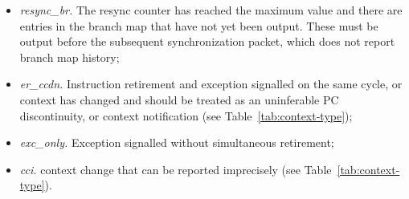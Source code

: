 \begin{itemize}
   \item \textit{resync\_br.} The resync counter has reached the maximum value and there are
     entries in the branch map that have not yet been output.  These must be output before
     the subsequent synchronization packet, which does not report branch map history;
   \item \textit{er\_ccdn.}  Instruction retirement and exception signalled on the same cycle, 
     or context has changed and should be treated as an uninferable PC discontinuity, or
     context notification (see Table~\ref{tab:context-type});
   \item \textit{exc\_only.}  Exception signalled without simultaneous retirement;
   \item \textit{cci.}  context change that can be reported imprecisely (see Table~\ref{tab:context-type}).
\end{itemize}

